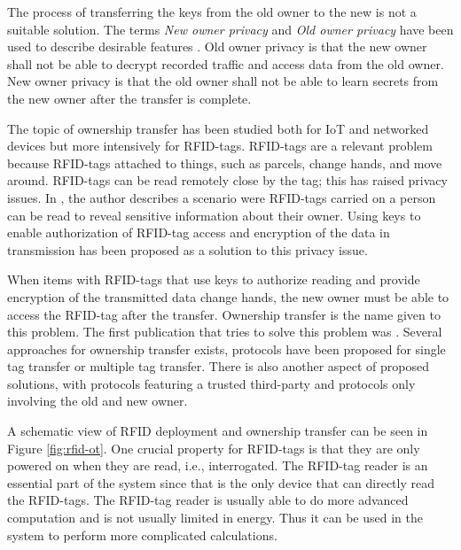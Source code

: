 The process of transferring the keys from the old owner to the new is not a suitable solution. The terms \emph{New owner privacy} and \emph{Old owner privacy} have been used to describe desirable features \cite{taqieddin2018tag}. Old owner privacy is that the new owner shall not be able to decrypt recorded traffic and access data from the old owner. New owner privacy is that the old owner shall not be able to learn secrets from the new owner after the transfer is complete.

The topic of ownership transfer has been studied both for IoT and networked devices but more intensively for RFID-tags. RFID-tags are a relevant problem because RFID-tags attached to things, such as parcels, change hands, and move around. RFID-tags can be read remotely close by the tag; this has raised privacy issues. In \cite{juels2006rfid}, the author describes a scenario were RFID-tags carried on a person can be read to reveal sensitive information about their owner. Using keys to enable authorization of RFID-tag access and encryption of the data in transmission has been proposed as a solution to this privacy issue. 

When items with RFID-tags that use keys to authorize reading and provide encryption of the transmitted data change hands, the new owner must be able to access the RFID-tag after the transfer. Ownership transfer is the name given to this problem. The first publication that tries to solve this problem was \cite{saito2005reassignment}. 
Several approaches for ownership transfer exists, protocols have been proposed for single tag transfer or multiple tag transfer. There is also another aspect of proposed solutions, with protocols featuring a trusted third-party and protocols only involving the old and new owner. 

A schematic view of RFID deployment and ownership transfer can be seen in Figure \ref{fig:rfid-ot}. One crucial property for RFID-tags is that they are only powered on when they are read, i.e., interrogated. The RFID-tag reader is an essential part of the system since that is the only device that can directly read the RFID-tags. The RFID-tag reader is usually able to do more advanced computation and is not usually limited in energy. Thus it can be used in the system to perform more complicated calculations.

